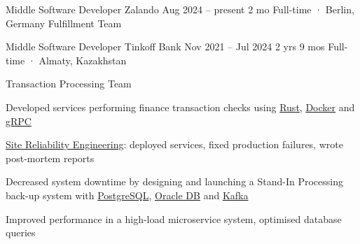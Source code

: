 \documentclass[11pt, a4paper]{style}
\begin{document}
\setcolumnwidth{5.5cm,2.7cm}
\begin{paracol}{2}



    \cvEntry
        {Middle Software Developer} {Zalando}
        {Aug 2024 -- present} {2 mo}
        {Full-time · Berlin, Germany}
        {
            Fulfillment Team \\
            \vspace{-5mm}
        }

    \cvEntry
        {Middle Software Developer} {Tinkoff Bank}
        {Nov 2021 -- Jul 2024} {2 yrs 9 mos}
        {Full-time · Almaty, Kazakhstan}
        {
            Transaction Processing Team \\
            \vspace{-5mm}
            \begin{cvItems}
                \item Developed services performing finance transaction checks using \underline{Rust}, \underline{Docker} and \underline{gRPC}
                \item \underline{Site Reliability Engineering}: deployed services, fixed production failures, wrote post-mortem reports
                \item Decreased system downtime by designing and launching a Stand-In Processing back-up system with \underline{PostgreSQL}, \underline{Oracle DB} and \underline{Kafka}
                \item Improved performance in a high-load microservice system, optimised database queries
            \end{cvItems}
        }


\end{paracol}
\end{document}
